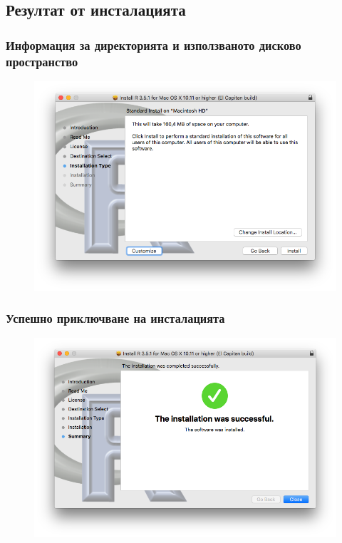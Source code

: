 \documentclass{beamer}
\begin{document}
\subsection{Резултат от инсталацията}

\begin{frame}
\frametitle{Информация за директорията и използваното дисково пространство}
\begin{figure}[]\includegraphics[width=\textwidth,height=0.75\textheight]{pic0010}\end{figure}
\end{frame}

\begin{frame}
\frametitle{Успешно приключване на инсталацията}
\begin{figure}[]\includegraphics[width=\textwidth,height=0.75\textheight]{pic0011}\end{figure}
\end{frame}
\end{document}

